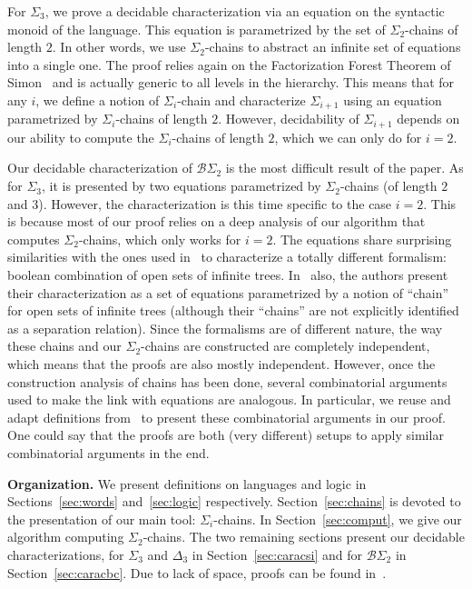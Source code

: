 \documentclass[envcountsame]{llncs}
\newcommand{\sic}[1]{\ensuremath{\Sigma_{#1}}\xspace}
\newcommand{\bscd}{\ensuremath{\mathcal{B}\Sigma_{2}}\xspace}
\newcommand{\dect}{\ensuremath{\Delta_{3}}\xspace}
\newcommand{\sict}{\ensuremath{\Sigma_{3}}\xspace}
\newcommand\chain{chain\xspace}
\newcommand\qchain[1]{\ensuremath{\sic{#1}}-chain\xspace}
\newcommand\chains{chains\xspace}
\newcommand\qchains[1]{\ensuremath{\sic{#1}}-chains\xspace}
\newcommand\ichain{\qchain{i}}
\newcommand\ichains{\qchains{i}}
\newcommand\dchains{\qchains{2}}
\begin{document}
For \sict, we prove a decidable characterization via an
equation on the syntactic monoid of the language. This equation is  
parametrized by the set of \dchains of length $2$. In other words,
we use \dchains to abstract an infinite set of equations into a
single one. The proof relies again on the Factorization Forest Theorem
of Simon~\cite{simonfacto} and is actually generic to all levels in
the hierarchy. This means that for any $i$, we define a notion of
\ichain and characterize \sic{i+1} using an equation parametrized by
\ichains of length $2$. However, decidability of \sic{i+1}
depends on our ability to compute the \ichains of length $2$, which we
can only do for $i =2$.

Our decidable characterization of \bscd is the most difficult result of the
paper. As for \sict, it is presented by two equations parametrized by \dchains
(of length $2$ and $3$). However, the characterization is this time specific
to the case $i = 2$. This is because most of our proof relies on a deep
analysis of our algorithm that computes \dchains, which only works for $i
=2$. The equations share surprising similarities with the ones used
in~\cite{bpopen} to characterize a totally different formalism: boolean
combination of open sets of infinite trees. In~\cite{bpopen} also, the authors
present their characterization as a set of equations parametrized by a notion
of ``\chain'' for open sets of infinite trees (although their ``\chains'' are
not explicitly identified as a separation relation). Since the formalisms are
of different nature, the way these \chains and our \dchains are constructed
are completely independent, which means that the proofs are also mostly
independent. However, once the construction analysis of \chains has been done,
several combinatorial arguments used to make the link with equations are
analogous. In particular, we reuse and adapt definitions from~\cite{bpopen} to
present these combinatorial arguments in our proof. One could say that the
proofs are both (very different) setups to apply similar combinatorial
arguments in the end.


\noindent
{\bf Organization.} We present definitions on languages
and logic in Sections~\ref{sec:words} and~\ref{sec:logic}
respectively. Section~\ref{sec:chains} is devoted to the presentation
of our main tool: \ichains. In Section~\ref{sec:comput}, we give our
algorithm computing \dchains. The two remaining sections present
our decidable characterizations, for \sict and \dect in
Section~\ref{sec:caracsi} and for \bscd in
Section~\ref{sec:caracbc}. Due to lack of space, proofs
can be found in~\cite{pz:qalt:2014}.
\end{document}
